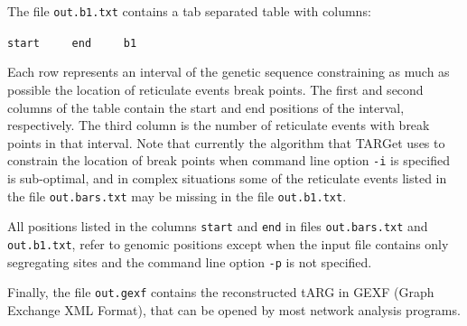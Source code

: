 \documentclass[12pt]{article}
\begin{document}
The file \texttt{out.b1.txt} contains a tab separated table with columns:

\texttt{start\ \ \ \ \ end\ \ \ \ \ b1}

\noindent Each row represents an interval of the genetic sequence constraining as much as possible the location of reticulate events break points. The first and second columns of the table contain the start and end positions of the interval, respectively. The third column is the number of reticulate events with break points in that interval. Note that currently the algorithm that TARGet uses to constrain the location of break points when command line option \texttt{-i} is specified is sub-optimal, and in complex situations some of the reticulate events listed in the file \texttt{out.bars.txt} may be missing in the file \texttt{out.b1.txt}.

All positions listed in the columns \texttt{start} and \texttt{end} in files \texttt{out.bars.txt} and \texttt{out.b1.txt}, refer to genomic positions except when the input file contains only segregating sites and the command line option \texttt{-p} is not specified.

Finally, the file \texttt{out.gexf} contains the reconstructed tARG in GEXF (Graph Exchange XML Format), that can be opened by most network analysis programs.

\newpage
\end{document}
